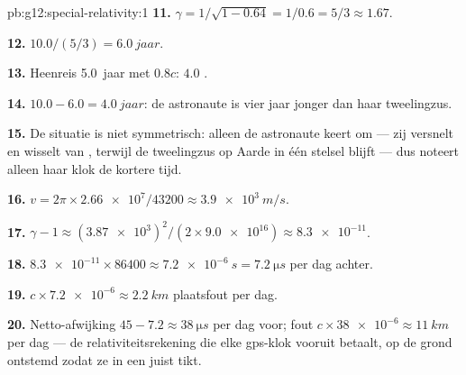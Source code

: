 \begin{solution}{pb:g12:special-relativity:1}
\textbf{11.} $\gamma = 1/\sqrt{1 - 0.64} = 1/0.6 = 5/3 \approx 1.67$.

\textbf{12.} $10.0/(5/3) = \qty{6.0}{jaar}$.

\textbf{13.} Heenreis \qty{5.0}{jaar} met $0.8c$: $4.0$ .

\textbf{14.} $10.0 - 6.0 = \qty{4.0}{jaar}$: de astronaute is vier jaar jonger
dan haar tweelingzus.

\textbf{15.} De situatie is niet symmetrisch: alleen de astronaute keert om ---
zij versnelt en wisselt van , terwijl de tweelingzus op Aarde
in één stelsel blijft --- dus noteert alleen haar klok de kortere tijd.

\textbf{16.} $v = 2\pi \times \num{2.66e7}/\num{43200} \approx
\qty{3.9e3}{m/s}$.

\textbf{17.} $\gamma - 1 \approx (\num{3.87e3})^2/(2 \times
\num{9.0e16}) \approx \num{8.3e-11}$.

\textbf{18.} $\num{8.3e-11} \times \num{86400} \approx \qty{7.2e-6}{s}
= \qty{7.2}{\micro s}$ per dag achter.

\textbf{19.} $c \times \num{7.2e-6} \approx \qty{2.2}{km}$ plaatsfout per dag.

\textbf{20.} Netto-afwijking $45 - 7.2 \approx \qty{38}{\micro s}$ per dag
voor; fout $c \times \num{38e-6} \approx \qty{11}{km}$ per dag --- de
relativiteitsrekening die elke gps-klok vooruit betaalt, op de grond ontstemd
zodat ze in een  juist tikt.
\end{solution}
